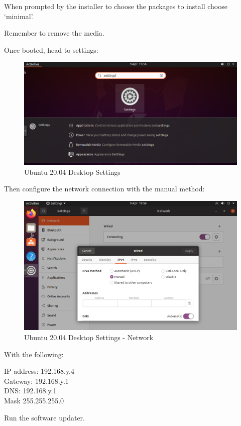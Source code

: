 When prompted by the installer to choose the packages to install choose
`minimal'.

Remember to remove the media.

Once booted, head to settings:

\begin{figure}
\centering
\includegraphics{UbuntuDesktop20_04Settings.png}
\caption{Ubuntu 20.04 Desktop Settings}
\end{figure}

Then configure the network connection with the manual method:

\begin{figure}
\centering
\includegraphics{UbuntuDesktop20_04SettingsNetwork.png}
\caption{Ubuntu 20.04 Desktop Settings - Network}
\end{figure}

With the following:

IP address: 192.168.y.4\\
Gateway: 192.168.y.1\\
DNS: 192.168.y.1\\
Mask 255.255.255.0

Run the software updater.

